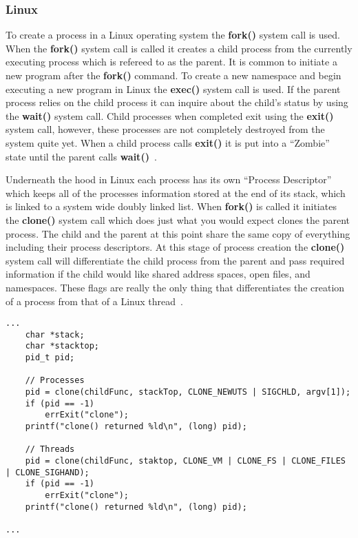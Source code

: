 \documentclass[letterpaper,10pt,notitlepage,fleqn]{article}
\begin{document}
\subsubsection*{Linux}
To create a process in a Linux operating system the \textbf{fork()} system call is 
used. When the \textbf{fork()} system call is called it creates a child process from 
the currently executing process which is refereed to as the parent. It is common to 
initiate a new program after the \textbf{fork()} command. To create a new namespace 
and begin executing a new program in Linux the \textbf{exec()} system call is used. 
If the parent process relies on the child process it can inquire about the child's 
status by using the \textbf{wait()} system call. Child processes when completed exit 
using the \textbf{exit()} system call, however, these processes are not completely 
destroyed from the system quite yet. When a child process calls \textbf{exit()} it is put 
into a ``Zombie'' state until the parent calls \textbf{wait()}~\cite{LKD3}.

Underneath the hood in Linux each process has its own ``Process Descriptor'' which 
keeps all of the processes information stored at the end of its stack, which is linked 
to a system wide doubly linked list. When \textbf{fork()} is called it initiates 
the \textbf{clone()} system call which does just what you would expect clones the 
parent process. The child and the parent at this point share the same copy of everything 
including their process descriptors. At this stage of process creation the \textbf{clone()} 
system call will differentiate the child process from the parent and pass required 
information if the child would like shared address spaces, open files, and 
namespaces. These flags are really the only thing that differentiates the creation 
of a process from that of a Linux thread~\cite{LKD3}.
\begin{lstlisting}
...
    char *stack;
    char *stacktop;
    pid_t pid;

    // Processes
    pid = clone(childFunc, stackTop, CLONE_NEWUTS | SIGCHLD, argv[1]);    
    if (pid == -1)
        errExit("clone");
    printf("clone() returned %ld\n", (long) pid);

    // Threads
    pid = clone(childFunc, staktop, CLONE_VM | CLONE_FS | CLONE_FILES | CLONE_SIGHAND);
    if (pid == -1)
        errExit("clone");
    printf("clone() returned %ld\n", (long) pid);

...
\end{lstlisting}
\end{document}
